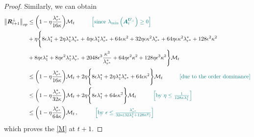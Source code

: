 \begin{proof}
    Similarly, we can obtain
    \begin{align*}
        \left\|\bm R^\perp_{t+1}\right\|_{op} & \leq \bigg(1-\eta \frac{\lambda^*_{r^*}}{16\kappa}\bigg)\mathcal{M}_t\quad \tag*{\color{teal}$\left[\text{since }\lambda_{\min}\left(\bm A^{\bm U_\perp}_t\right)\geq 0\right]$}\\
        & + \eta \Bigg\{8\epsilon \lambda_1^*+2\eta \lambda_1^* \lambda_{r^*}^* + 4\eta \epsilon \lambda_1^* \lambda_{r^*}^* + 64 \epsilon \kappa^2 + 32 \eta \epsilon \kappa^2\lambda_{r^*}^*+64\eta \epsilon \kappa^2 \lambda_{r^*}^*+128\epsilon^2\kappa^2\\
        & + 8\eta \epsilon \lambda_1^* + 8\eta \epsilon^2 \lambda_1^* \lambda_{r^*}^* + 2048 \epsilon^3\frac{\kappa^3}{\lambda_{r^*}^*}+64\eta \epsilon^2 \kappa^2 + 128 \eta \epsilon^3\kappa^2
        \Bigg\}\mathcal{M}_t\\
        & \leq \bigg(1-\eta \frac{\lambda^*_{r^*}}{16\kappa}\bigg)\mathcal{M}_t
        + 2\eta \Bigg\{8\epsilon \lambda_1^*+2\eta \lambda_1^* \lambda_{r^*}^* + 64 \epsilon \kappa^2\Bigg\}\mathcal{M}_t\quad \tag*{\color{teal}[due to the order dominance]}\\
        & \leq \bigg(1-\eta \frac{\lambda^*_{r^*}}{32\kappa}\bigg)\mathcal{M}_t
        + 2\eta \Bigg\{8\epsilon \lambda_1^*+ 64 \epsilon \kappa^2\Bigg\}\mathcal{M}_t\quad \tag*{\color{teal}$\left[\text{by }\eta \leq \frac{1}{128\kappa\lambda_1^*}\right]$}\\
        & \leq \bigg(1-\eta \frac{\lambda^*_{r^*}}{64\kappa}\bigg)\mathcal{M}_t\,,\quad \tag*{\color{teal}$\left[\text{by }\epsilon \leq \frac{\lambda^*_{r^*}}{32\kappa(32 \lambda_1^*+128 \kappa^2)}\right]$}
    \end{align*}
    which proves the \cref{M} at $t+1$. 
    

\end{proof}
